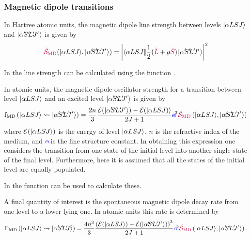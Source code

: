 \documentclass[11pt, twoside,openright]{article}
\begin{document}
\subsubsection{Magnetic dipole transitions}

In Hartree atomic units, the magnetic dipole line strength between levels $|\alpha{LSJ}\rangle$ and $\ket{\alpha\mathrlap{'} S\mathrlap{'} L\mathrlap{'} J\mathrlap{'}\,\,}$ is given by
\begin{equation} 
	\lineStrengthMD(\ket{\alpha{LSJ}},\ket{\alpha\mathrlap{'} S\mathrlap{'} L\mathrlap{'} J\mathrlap{'}\,\,}) = 
	\left|\redbraopket{\alpha{LSJ}}{\frac{1}{2}(\op{L}+g \op{S})}{\alpha\mathrlap{'} S\mathrlap{'} L\mathrlap{'} J\mathrlap{'}\,\,} \right|^2
\end{equation}

In \qlanth the line strength can be calculated using the function .

 

In atomic units, the magnetic dipole oscillator strength for a transition between level $|\alpha{LSJ}\rangle$ and an excited level $\ket{\alpha\mathrlap{'} S\mathrlap{'} L\mathrlap{'} J\mathrlap{'}\,\,}$ is given by \cite{rudzikas_theoretical_2007}
\begin{equation} 
	\oStrength{MD}{\alpha{LSJ}}{\alpha\mathrlap{'} S\mathrlap{'} L\mathrlap{'} J\mathrlap{'}\,\,} = \frac{2 n}{3}
	\frac{
	\mathcal{E}(
		\ket{\alpha\mathrlap{'}
			S\mathrlap{'}
			L\mathrlap{'}
			J\mathrlap{'}\,\,})-
	\mathcal{E}(
		\ket{\alpha{LSJ}
		)}}
	{2J+1}
	\alphaFine^2
	\lineStrengthMD\left(\ket{\alpha{LSJ}},\ket{\alpha\mathrlap{'} S\mathrlap{'} L\mathrlap{'} J\mathrlap{'}\,\,}\right)
\end{equation}
where $\mathcal{E}(|\alpha{LSJ}\rangle)$ is the energy of level $|\alpha{LSJ}\rangle$, $n$ is the refractive index of the medium, and $\alphaFine$ is the fine structure constant. In obtaining this expression one considers the transition from one state of the initial level into another single state of the final level. Furthermore, here it is assumed that all the states of the initial level are equally populated.

In \qlanth the function  can be used to calculate these.

 


A final quantity of interest is the spontaneous magnetic dipole decay rate from one level to a lower lying one. In atomic units this rate is determined by 
\begin{equation}
	\decayRate{MD}{\alpha{LSJ}}{\alpha\mathrlap{'}
			S\mathrlap{'}
			L\mathrlap{'}
			J\mathrlap{'}} = \frac{4 n^3}{3} 
			\frac{
				\left(
					\mathcal{E}(
						\ket{\alpha{LSJ}}) - 
					\mathcal{E}(
						\ket{\alpha\mathrlap{'}
							S\mathrlap{'}
							L\mathrlap{'}
							J\mathrlap{'}\,\,})
				\right)^3
				}
				{2J+1} 
		\alphaFine^5
		\lineStrengthMD\left(\ket{\alpha{LSJ}},\ket{\alpha\mathrlap{'} S\mathrlap{'} L\mathrlap{'} J\mathrlap{'}\,\,}\right).
\end{equation}
\end{document}
